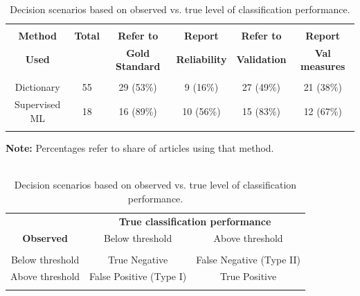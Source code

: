\documentclass[man, 12pt, a4paper, nolmodern, noextraspace]{apa6}
\begin{document}
\begin{table}[!htbp] \centering 
	\begin{minipage}{\textwidth}
    \centering
  \caption{\\ Results of the systematic literature review} 
  \label{tab:Table1} 
\begin{tabular}{@{\extracolsep{5pt}} cccccc} 
\\[-1.8ex]\hline 
\hline \\[-1.8ex] 
 \textbf{Method} & \textbf{Total} & \textbf{Refer to} &  \textbf{Report} & \textbf{Refer to} & \textbf{Report} \\ 
 \textbf{Used} & & \textbf{Gold Standard} & \textbf{Reliability} & \textbf{Validation} & \textbf{Val measures} \\
\hline \\[-1.8ex] 
 Dictionary & 55 & 29 (53\%) & 9 (16\%) & 27 (49\%) & 21 (38\%) \\
 Supervised ML & 18 & 16 (89\%) & 10 (56\%) & 15 (83\%) & 12 (67\%) \\
\hline \\[-1.8ex]  
\end{tabular} 
\begin{tablenotes}
\small \vspace{0.15in}
\textbf{Note:} Percentages refer to share of articles using that method.\\ 
\end{tablenotes}
 	\end{minipage}
\bigbreak
\vspace{0.5in}
 	\begin{minipage}{\textwidth}
    \centering
\caption{\\ Decision scenarios based on observed vs. true level of classification performance.} 
  \label{tab:Table2} 
  \begin{tabular}{ ccc}
\toprule
      \multicolumn{1}{c}{} & \multicolumn{2}{c}{\textbf{True classification performance}} \\
\cline{2-3}
   \textbf{Observed} & Below threshold & Above threshold \\
\hline \\[-1.8ex] 
 Below threshold & True Negative & False Negative (Type II) \\ 
 Above threshold & False Positive (Type I) & True Positive \\ 
\hline \\[-1.8ex]  
  \end{tabular}
  \end{minipage}
\end{table} 
\end{document}
